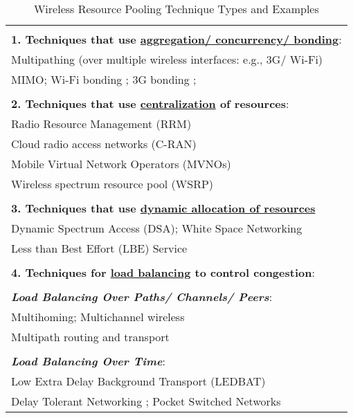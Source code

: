 \documentclass{sigcomm-alternate}
\begin{document}
\begin{table}[!ht]
\centering
\scriptsize
\caption{Wireless Resource Pooling Technique Types and Examples}
\label{tab:MP_advantages}
\begin{tabular}{p{8.3cm}}
\hline
\\

\textbf{1. Techniques that use \underline{aggregation/ concurrency/ bonding}}:\\
Multipathing (over multiple wireless interfaces: e.g., 3G/ Wi-Fi)\\ 
MIMO; Wi-Fi bonding \cite{bukhari2016survey}; 3G bonding \cite{sathiaseelan2013internet};\\ 


\\
\textbf{2. Techniques that use \underline{centralization} of resources}:\\
Radio Resource Management (RRM)\\
Cloud radio access networks (C-RAN) \cite{checko2014cloud}\\
Mobile Virtual Network Operators (MVNOs)\\
Wireless spectrum resource pool (WSRP) \cite{yang2013openran}\\

\\
\textbf{3. Techniques that use \underline{dynamic allocation of resources}}\\
Dynamic Spectrum Access (DSA); White Space Networking\\
Less than Best Effort (LBE) Service \cite{shalunov2010low}\\


\\
\textbf{4. Techniques for \underline{load balancing} to control congestion}:\\
\\
\textit{\textbf{Load Balancing Over Paths/ Channels/ Peers}}:\\
Multihoming; Multichannel wireless\\
Multipath routing and transport\\

\\
\textit{\textbf{Load Balancing Over Time}}:\\
Low Extra Delay Background Transport (LEDBAT) \cite{shalunov2010low}\\
Delay Tolerant Networking \cite{fall2003delay}; Pocket Switched Networks \cite{chaintreau2005pocket}\\


\end{tabular}
\end{table}
\end{document}
